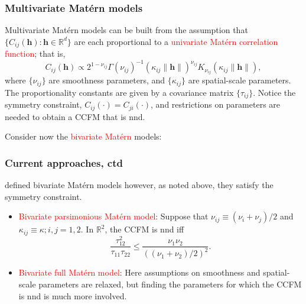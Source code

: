 \documentclass{beamer}
\newcommand{\s}{\mathbf{s}}
\renewcommand{\u}{\mathbf{u}}
\begin{document}

\begin{frame}
\frametitle{Multivariate Mat\'{e}rn models}
Multivariate Mat\'{e}rn models can be built from the assumption that $\{C_{ij}(\mathbf{h}):\mathbf{h}\in\mathbb{R}^d\}$ are each proportional to a \textcolor{red}{univariate Mat\'{e}rn correlation function}; that is,
$$
C_{ij}(\mathbf{h})\propto 2^{1-\nu_{ij}}\Gamma(\nu_{ij})^{-1}(\kappa_{ij}\|\mathbf{h}\|)^{\nu_{ij}}K_{\nu_{ij}}(\kappa_{ij}\|\mathbf{h}\|),
$$
where $\{\nu_{ij}\}$ are smoothness parameters, and $\{\kappa_{ij}\}$ are spatial-scale parameters. The proportionality constants are given by a covariance matrix $\{\tau_{ij}\}$. Notice the symmetry constraint, $C_{ij}(\cdot)=C_{ji}(\cdot)$, and restrictions on parameters are needed to obtain a CCFM that is nnd. 

Consider now the \textcolor{red}{bivariate Mat\'{e}rn} models:
\vfill
\end{frame}


\begin{frame}
\frametitle{Current approaches, ctd}
\cite{Gneitingetal2010} defined bivariate Mat\'{e}rn models however, as noted above, they satisfy the symmetry constraint.
\begin{itemize}
\item \textcolor{red}{Bivariate parsimonious Matérn model}: Suppose that $\nu_{ij}\equiv(\nu_i+\nu_j)/2$ and $\kappa_{ij}\equiv\kappa;i,j=1,2$. In $\mathbb{R}^2$, the CCFM is nnd iff
$$
\frac{\tau_{12}^2}{\tau_{11}\tau_{22}}\leq\frac{\nu_1\nu_2}{((\nu_1+\nu_2)/2)^2}.
$$



\item \textcolor{red}{Bivariate full Matérn model}:  Here assumptions on smoothness and spatial-scale parameters are relaxed, but finding the parameters for which the CCFM is nnd is much more involved.\vfill
\end{itemize}
\vfill
\end{frame}
\end{document}
